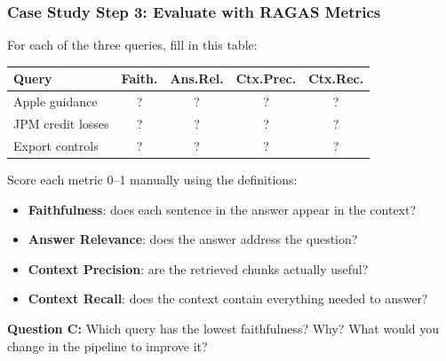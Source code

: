 \documentclass[9pt,t]{beamer}
\begin{document}
\begin{frame}
\frametitle{Case Study Step 3: Evaluate with RAGAS Metrics}

For each of the three queries, fill in this table:

\medskip
\begin{center}
\begin{tabular}{lcccc}
\toprule
\textbf{Query} & \textbf{Faith.} & \textbf{Ans.Rel.} & \textbf{Ctx.Prec.} & \textbf{Ctx.Rec.} \\
\midrule
Apple guidance & ? & ? & ? & ? \\
JPM credit losses & ? & ? & ? & ? \\
Export controls & ? & ? & ? & ? \\
\bottomrule
\end{tabular}
\end{center}

\medskip
Score each metric 0--1 manually using the definitions:
\begin{itemize}
  \item \textbf{Faithfulness}: does each sentence in the answer appear in the context?
  \item \textbf{Answer Relevance}: does the answer address the question?
  \item \textbf{Context Precision}: are the retrieved chunks actually useful?
  \item \textbf{Context Recall}: does the context contain everything needed to answer?
\end{itemize}

\medskip
\textbf{Question C:} Which query has the lowest faithfulness? Why?
What would you change in the pipeline to improve it?
\end{frame}
\end{document}
